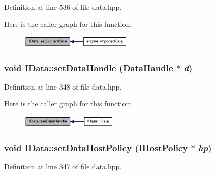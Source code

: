 Definition at line 536 of file data.hpp.

Here is the caller graph for this function:\nopagebreak
\begin{figure}[H]
\begin{center}
\leavevmode
\includegraphics[width=152pt]{class_i_data_a640ef011d2cef11627d21ad5b6ab2cdb_icgraph}
\end{center}
\end{figure}
\hypertarget{class_i_data_a7e8587fe8eee5211a393f20752712bbc}{
\subsubsection[{setDataHandle}]{\setlength{\rightskip}{0pt plus 5cm}void IData::setDataHandle ({\bf DataHandle} $\ast$ {\em d})}}
\label{class_i_data_a7e8587fe8eee5211a393f20752712bbc}


Definition at line 348 of file data.hpp.

Here is the caller graph for this function:\nopagebreak
\begin{figure}[H]
\begin{center}
\leavevmode
\includegraphics[width=132pt]{class_i_data_a7e8587fe8eee5211a393f20752712bbc_icgraph}
\end{center}
\end{figure}
\hypertarget{class_i_data_ae65b99c98bd1dcb8c86dd2f8d2a4f9dd}{
\subsubsection[{setDataHostPolicy}]{\setlength{\rightskip}{0pt plus 5cm}void IData::setDataHostPolicy ({\bf IHostPolicy} $\ast$ {\em hp})}}
\label{class_i_data_ae65b99c98bd1dcb8c86dd2f8d2a4f9dd}


Definition at line 347 of file data.hpp.

